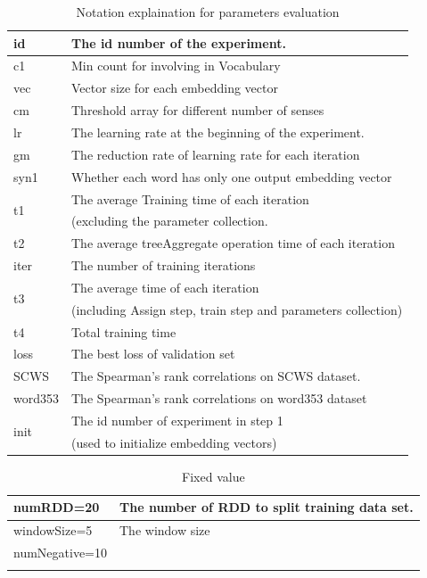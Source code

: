 \begin{table}[H]
\begin{center}
\begin{tabular}{|l|l|}
\hline
id & The id number of the experiment. \\ \hline
c1 &  Min count for involving in Vocabulary\\ \hline
vec & Vector size for each embedding vector\\ \hline
cm &  Threshold array for different number of senses\\ \hline
lr &  The learning rate at the beginning of the experiment.\\ \hline
gm &  The reduction rate of learning rate for each iteration\\ \hline
syn1 & Whether each word has only one output embedding vector\\ \hline
\multirow{2}{*}{t1} 
& The average Training time of each iteration \\ 
&(excluding the parameter collection.\\ \hline
t2 & The average treeAggregate operation time of each iteration \\ \hline
iter & The number of training iterations \\ \hline
\multirow{2}{*}{t3} 
&The average time of each iteration \\
&(including Assign step, train step and parameters collection) \\ \hline

t4 & Total training time \\ \hline
loss & The best loss of validation set \\ \hline
SCWS & The Spearman’s rank correlations on SCWS dataset. \\ \hline
word353 & The Spearman’s rank correlations on word353 dataset \\ \hline
\multirow{2}{*}{init} 
& The id number of experiment in step 1 \\
&(used to initialize embedding vectors)\\
\hline
\end{tabular}
\caption{Notation explaination for parameters evaluation } \label{tab:notation}
\end{center}
\end{table}

\begin{table}[H]
\begin{center}
\begin{tabular}{|l|l|}
\hline
numRDD=20 & The number of RDD to split training data set.\\ \hline
 windowSize=5& The window size  \\ \hline
 numNegative=10& \\ \hline
 &  \\ \hline

\hline
\end{tabular}
\caption{Fixed value} \label{tab:fixvalue}
\end{center}
\end{table}


